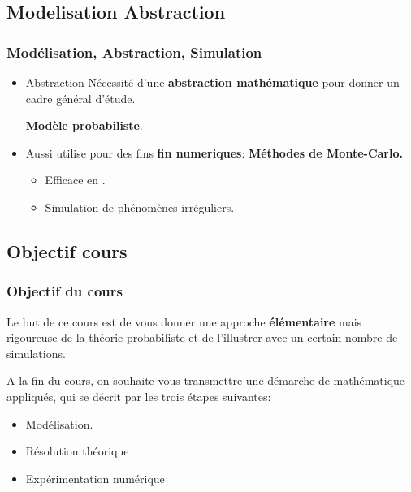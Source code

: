 \documentclass{beamer}
\begin{document}
\subsection{Modelisation Abstraction}
\begin{frame}[<+->]
    \frametitle{Modélisation, Abstraction, Simulation}
    
    \begin{itemize}
        \item {}

            \begin{block}{Abstraction}
                \small
                Nécessité d'une \alert{\textbf{abstraction mathématique}}  pour donner un cadre général d'étude.
            \end{block}
            \begin{center}
                \textbf{Modèle probabiliste}.
            \end{center}
        \item Aussi utilise pour des fins \textbf{fin numeriques}:
            \alert{\textbf{Méthodes de
        Monte-Carlo.}}
        \vspace{1cm}
         \begin{itemize}
             \item Efficace en \textbf{}.\\[.5cm]
             \item Simulation de \alert{{phénomènes irréguliers.}}
         \end{itemize}
    \end{itemize}
\end{frame}
\subsection{Objectif cours}
\begin{frame}[<+->]
    \frametitle{Objectif du cours}
    \small
    Le but  de ce cours est de vous donner une approche \textbf{élémentaire} mais
    \alert{rigoureuse} de la théorie probabiliste et de l'illustrer avec un
    certain nombre de simulations.
    \vspace{.5cm}
    
    A la fin du cours, on souhaite vous transmettre une démarche de mathématique
    appliqués, qui se décrit par les trois étapes suivantes:

    \vspace{.5cm}
    \begin{itemize}
        \item Modélisation.
          \item Résolution théorique
          \item Expérimentation numérique
    \end{itemize}
\end{frame}
\end{document}
